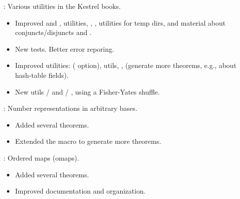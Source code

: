 
\begin{frame}

\implibtitle

:
Various utilities in the Kestrel books.
\begin{itemize}
\item Improved  and ,  utilities, , , utilities for temp dirs, and material about conjuncts/disjuncts and .
\item New tests. Better error reporing.
\item Improved utilities:  ( option),  utils, ,  (generate more theorems, e.g., about hash-table fields).
\item New utils  /  and  / , using a Fisher-Yates shuffle.
\end{itemize}

\end{frame}


\begin{frame}

\implibtitle

:
Number representations in arbitrary bases.
\begin{itemize}
\item Added several theorems.
\item Extended the  macro to generate more theorems.
\end{itemize}

\end{frame}


\begin{frame}

\implibtitle

:
Ordered maps (omaps).
\begin{itemize}
\item Added several theorems.
\item Improved documentation and organization.
\end{itemize}

\end{frame}

